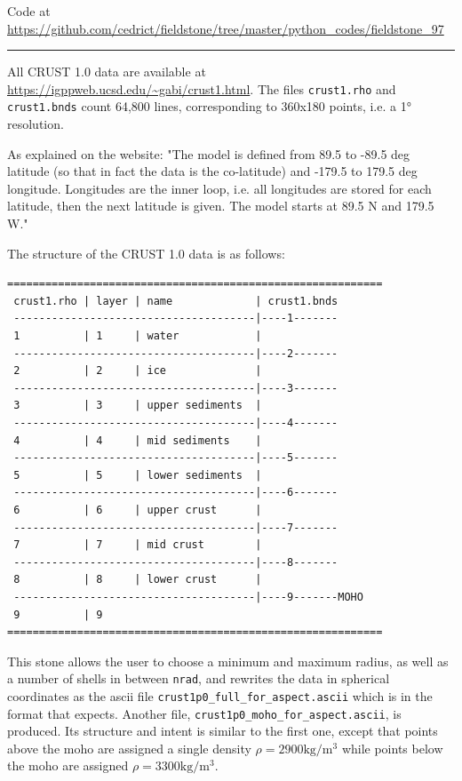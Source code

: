 

\begin{center}
Code at \url{https://github.com/cedrict/fieldstone/tree/master/python_codes/fieldstone_97}
\end{center}

\par\noindent\rule{\textwidth}{0.4pt}


All CRUST 1.0 data are available at \url{https://igppweb.ucsd.edu/~gabi/crust1.html}. 
The files {\tt crust1.rho} and {\tt crust1.bnds} count 64,800 lines,
corresponding to 360x180 points, i.e. a 1\si{\degree} resolution. 

As explained on the website: 
"The model is defined from 89.5 to -89.5 deg latitude (so that 
in fact the data is the co-latitude) and -179.5 to 179.5 deg
longitude. Longitudes are the inner loop, i.e. all longitudes are stored
for each latitude, then the next latitude is given. The model starts at 
89.5 N and 179.5 W."

The structure of the CRUST 1.0 data is as follows:

\begin{verbatim}
===========================================================
 crust1.rho | layer | name             | crust1.bnds
 --------------------------------------|----1-------
 1          | 1     | water            |
 --------------------------------------|----2-------
 2          | 2     | ice              |
 --------------------------------------|----3-------
 3          | 3     | upper sediments  |
 --------------------------------------|----4-------
 4          | 4     | mid sediments    |
 --------------------------------------|----5-------
 5          | 5     | lower sediments  | 
 --------------------------------------|----6-------
 6          | 6     | upper crust      |
 --------------------------------------|----7-------
 7          | 7     | mid crust        |
 --------------------------------------|----8-------
 8          | 8     | lower crust      |
 --------------------------------------|----9-------MOHO
 9          | 9
===========================================================
\end{verbatim}

This stone allows the user to choose a minimum and maximum radius, as well as a 
number of shells in between {\tt nrad}, and rewrites the data in spherical coordinates 
as the ascii file {\tt crust1p0\_full\_for\_aspect.ascii} which is in the format that \aspect{} expects.
Another file, {\tt crust1p0\_moho\_for\_aspect.ascii}, is produced. Its structure and intent
is similar to the first one, except that points above the moho are assigned a single 
density $\rho=2900\si{\kilo\gram\per\cubic\metre}$ while points below the 
moho are assigned $\rho=3300\si{\kilo\gram\per\cubic\metre}$.

